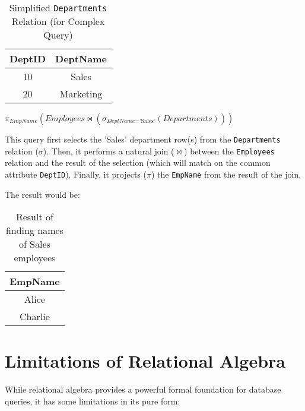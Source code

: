 \documentclass[12pt]{book}
\begin{document}
\begin{table}[htbp]
\centering
\begin{tabular}{@{}cc@{}}
\toprule
DeptID & DeptName \\
\midrule
10 & Sales \\
20 & Marketing \\
\bottomrule
\end{tabular}
\caption{Simplified \texttt{Departments} Relation (for Complex Query)}
\label{tab:departments_complex_query}
\end{table}

$\pi_{\textit{EmpName}}( \mathit{Employees} \Join (\sigma_{\textit{DeptName} = \text{'Sales'}}(\mathit{Departments})) )$

This query first selects the 'Sales' department row(s) from the \texttt{Departments} relation ($\sigma$). Then, it performs a natural join ($\Join$) between the \texttt{Employees} relation and the result of the selection (which will match on the common attribute \texttt{DeptID}). Finally, it projects ($\pi$) the \texttt{EmpName} from the result of the join.

The result would be:

\begin{table}[htbp]
\centering
\begin{tabular}{@{}c@{}}
\toprule
EmpName \\
\midrule
Alice \\
Charlie \\
\bottomrule
\end{tabular}
\caption{Result of finding names of Sales employees}
\label{tab:complex_query2_result}
\end{table}

\section{Limitations of Relational Algebra}

While relational algebra provides a powerful formal foundation for database queries, it has some limitations in its pure form:
\end{document}
